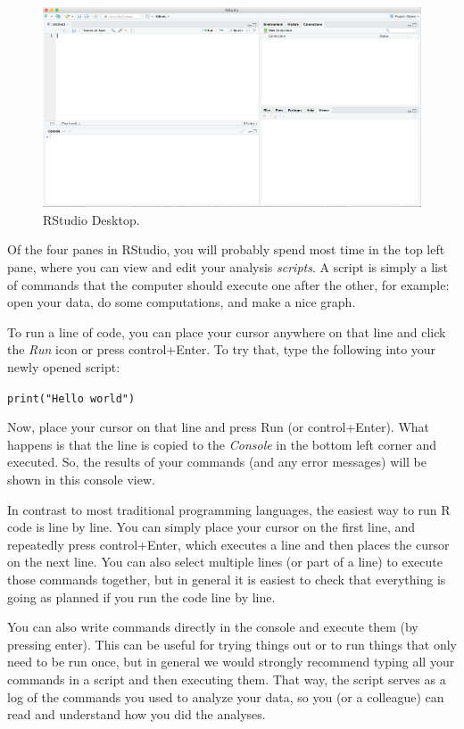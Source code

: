 \begin{figure}
\centering
\includegraphics[width=0.9\linewidth]{figures/ch3_r_studio.png}
\caption{RStudio Desktop.}
\label{fig:rstudio}
\end{figure}

Of the four panes in RStudio,
you will probably spend most time in the top left pane, where you can view and edit your analysis \emph{scripts}.
A script is simply a list of commands that the computer should execute one after the other,
for example: open your data, do some computations, and make a nice graph. 

To run a line of code, you can place your cursor anywhere on that line and click the \emph{Run} icon or
press control+Enter.
To try that, type the following into your newly opened script:

\verb|print("Hello world")|

Now, place your cursor on that line and press Run (or control+Enter).
What happens is that the line is copied to the \emph{Console} in the bottom left corner
and executed.
So, the results of your commands (and any error messages) will be shown in this console view.

In contrast to most traditional programming languages,
the easiest way to run R code is line by line.
You can simply place your cursor on the first line,
and repeatedly press control+Enter, which executes a line and then places the cursor on the next line.
You can also select multiple lines (or part of a line) to execute those commands together,
but in general it is easiest to check that everything is going as planned if you run the code line by line.

You can also write commands directly in the console and execute them (by pressing enter).
This can be useful for trying things out or to run things that only need to be run once,
but in general we would strongly recommend typing all your commands in a script and then executing them.
That way, the script serves as a log of the commands you used to analyze your data,
so you (or a colleague) can read and understand how you did the analyses. 

